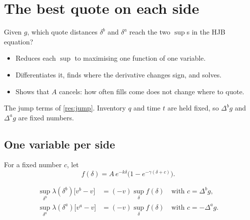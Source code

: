 \chapter{The best quote on each side}
\label{ch:best}

\begin{question}
Given $g$, which quote distances $\delta^b$ and $\delta^a$ reach the two $\sup$s in the HJB equation?
\end{question}

\begin{whatfor}
\begin{itemize}
  \item Reduces each $\sup$ to maximising one function of one variable.
  \item Differentiates it, finds where the derivative changes sign, and solves.
  \item Shows that $A$ cancels: how often fills come does not change where to quote.
\end{itemize}
\end{whatfor}

\begin{setup}[Setup]
The jump terms of \cref{res:jump}. Inventory $q$ and time $t$ are held fixed, so $\Delta^bg$ and $\Delta^ag$ are fixed numbers.
\end{setup}

\section{One variable per side}

\begin{definition}
\label{def:f}
For a fixed number $c$, let
\[
  f(\delta)=A\,e^{-k\delta}\Big(1-e^{-\gamma(\delta+c)}\Big).
\]
\end{definition}

\begin{result}
\label{res:reduce}
\[
  \begin{aligned}
    \sup_{\delta^b}\lambda(\delta^b)\big[v^b-v\big]&=(-v)\sup_{\delta}f(\delta)\quad\text{with }c=\Delta^bg,\\
    \sup_{\delta^a}\lambda(\delta^a)\big[v^a-v\big]&=(-v)\sup_{\delta}f(\delta)\quad\text{with }c=-\Delta^ag.
  \end{aligned}
\]
\end{result}

